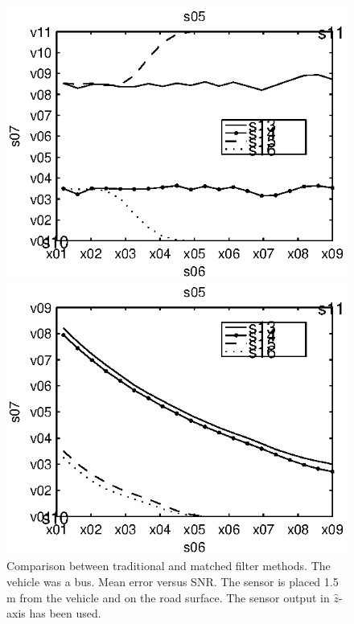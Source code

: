 \begin{subfigures}
\begin{figure}[!tbhf]
  \centering
  \begin{minipage}{0.45\linewidth}
  \centering
  
   \includegraphics[width=\linewidth]{images/mean_error_z_bus}
  \caption[Time difference, method comparison. Mean error. $\hat{z}$-axis. (Bus)]{Comparison between traditional and matched filter methods. The vehicle was a bus. Mean error versus SNR. The sensor is placed 1.5 m from the vehicle and on the road surface. The sensor output in $\hat{z}$-axis has been used.}
  \label{fig:comp_mean_z_bus}
  \end{minipage}\hfill
  \begin{minipage}{0.45\linewidth}
   \centering
   
   \includegraphics[width=\linewidth]{images/std_error_z_bus}

\end{minipage}
\end{figure}
\end{subfigures}
